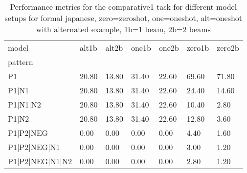 \begin{table}[h]
\begin{tabular}{l|llllll}
\toprule
model & alt1b & alt2b & one1b & one2b & zero1b & zero2b \\
pattern &  &  &  &  &  &  \\
\midrule
P1 & 20.80 & 13.80 & 31.40 & 22.60 & 69.60 & 71.80 \\
P1|N1 & 20.80 & 13.80 & 31.40 & 22.60 & 24.40 & 14.60 \\
P1|N1|N2 & 20.80 & 13.80 & 31.40 & 22.60 & 10.40 & 2.80 \\
P1|N2 & 20.80 & 13.80 & 31.40 & 22.60 & 12.80 & 3.60 \\
P1|P2|NEG & 0.00 & 0.00 & 0.00 & 0.00 & 4.40 & 1.60 \\
P1|P2|NEG|N1 & 0.00 & 0.00 & 0.00 & 0.00 & 3.00 & 1.20 \\
P1|P2|NEG|N1|N2 & 0.00 & 0.00 & 0.00 & 0.00 & 2.80 & 1.20 \\
\bottomrule
\end{tabular}
\caption{Performance metrics for the comparative1 task for different model setups for formal japanese, zero=zeroshot, one=oneshot, alt=oneshot with alternated example, 1b=1 beam, 2b=2 beams}
\label{tab:ja form_comparative1_performance}
\end{table}
